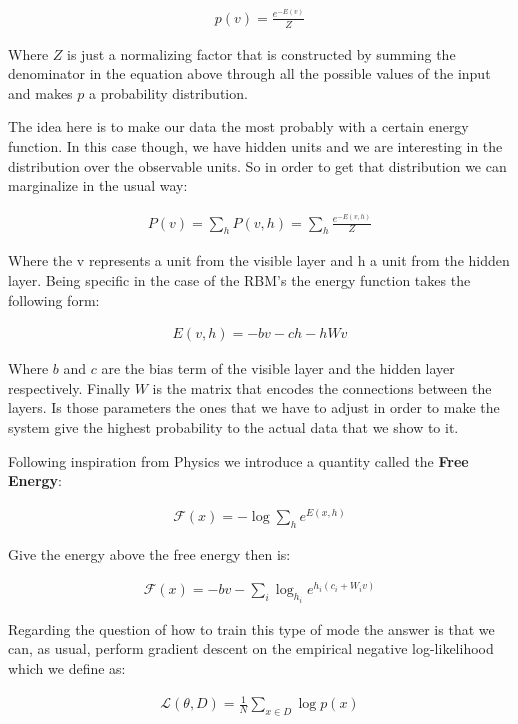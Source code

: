\documentclass[11pt,a4paper]{article}
\begin{document}
\begin{align*}
p(v) = \frac{e^{-E(v)}}{Z}
\end{align*}

Where $Z$ is just a normalizing factor that is constructed by summing the denominator in the equation above through all the possible values of the input and makes $p$ a probability distribution. 

The idea here is to make our data the most probably with a certain energy function. In this case though, we have hidden units and we are interesting in the distribution over the observable units. So in order to get that distribution we can marginalize in the usual way:

\begin{align*}
P(v) = \sum_{h} P(v,h) = \sum_{h} \frac{e^{-E(v, h)}}{Z}
\end{align*}

Where the v represents a unit from the visible layer and h a unit from the hidden layer. Being specific in the case of the RBM's the energy function takes the following form:

\begin{align*}
E(v, h) = -bv -ch - hWv 
\end{align*}

Where $b$ and $c$ are the bias term of the visible layer and the hidden layer respectively. Finally $W$ is the matrix that encodes the connections between the layers. Is those parameters the ones that we have to adjust in order to make the system give the highest probability to the actual data that we show to it. 

Following inspiration from Physics we introduce a quantity called the \textbf{Free Energy}: 

\begin{align*}
\mathcal{F}(x) = - \log \sum_{h} e^{E(x, h)}
\end{align*}

Give the energy above the free energy then is:

\begin{align*}
\mathcal{F}(x) = -bv - \sum_i \log_{h_i} e^{h_i(c_i + W_i v)}
\end{align*}

Regarding the question of how to train this type of mode the answer is that we can, as usual, perform gradient descent on the empirical negative log-likelihood which we define as: 


\begin{align*}
\mathcal{L}(\theta, D) = \frac{1}{N} \sum_{x \in D} \log p(x)
\end{align*}
\end{document}
